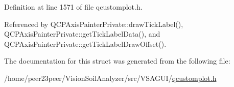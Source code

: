 Definition at line 1571 of file qcustomplot.\+h.



Referenced by Q\+C\+P\+Axis\+Painter\+Private\+::draw\+Tick\+Label(), Q\+C\+P\+Axis\+Painter\+Private\+::get\+Tick\+Label\+Data(), and Q\+C\+P\+Axis\+Painter\+Private\+::get\+Tick\+Label\+Draw\+Offset().



The documentation for this struct was generated from the following file\+:\begin{DoxyCompactItemize}
\item 
/home/peer23peer/\+Vision\+Soil\+Analyzer/src/\+V\+S\+A\+G\+U\+I/\hyperlink{qcustomplot_8h}{qcustomplot.\+h}\end{DoxyCompactItemize}
